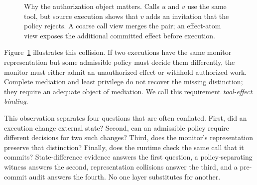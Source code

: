 \documentclass[letterpaper,twocolumn,10pt]{article}
\theoremstyle{definition}
\begin{document}
\begin{figure}[t]
\caption{Why the authorization object matters.  Calls $u$ and $v$ use the
same tool, but source execution shows that $v$ adds an invitation that the
policy rejects.  A coarse call view merges the pair; an effect-atom view
exposes the additional committed effect before execution.}
\label{fig:representation-collision}
\end{figure}


Figure~\ref{fig:representation-collision} illustrates this collision.  If two
executions have the same monitor representation but some admissible policy
must decide them differently, the monitor must either admit an unauthorized
effect or withhold authorized work.  Complete mediation and least privilege do
not recover the missing distinction; they require an adequate object of
mediation.  We call this requirement \emph{tool-effect binding}.

This observation separates four questions that are often conflated.  First,
did an execution change external state?  Second, can an admissible policy
require different decisions for two such changes?  Third, does the monitor's
representation preserve that distinction?  Finally, does the runtime check the
same call that it commits?  State-difference evidence answers the first
question, a policy-separating witness answers the second, representation
collisions answer the third, and a pre-commit audit answers the fourth.  No one
layer substitutes for another.
\end{document}
